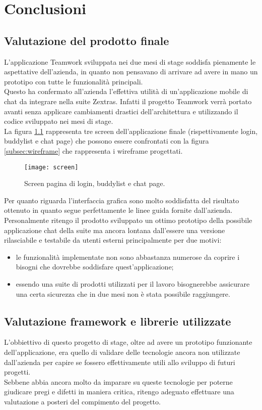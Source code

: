 
\chapter{Conclusioni}\label{chap:conclusions}
\section{Valutazione del prodotto finale}
L’applicazione Teamwork sviluppata nei due mesi di stage soddisfa pienamente le aspettative dell’azienda, in quanto non pensavano di arrivare ad avere in mano un prototipo con tutte le funzionalità principali. \\
Questo ha confermato all'azienda l'effettiva utilità di un'applicazione mobile di chat da integrare nella suite Zextras. Infatti il progetto Teamwork verrà portato avanti senza applicare cambiamenti drastici dell'architettura e utilizzando il codice sviluppato nei mesi di stage.\\
La figura \ref{sec:valutazione} rappresenta tre screen dell'applicazione finale (rispettivamente login, buddylist e chat page) che possono essere confrontati con la figura \ref{subsec:wireframe} che rappresenta i wireframe progettati.
\begin{figure}[H] 
	\centering
	\texttt{[image: screen]}
	\caption{Screen pagina di login, buddylist e chat page.}
	\label{sec:valutazione}
\end{figure}
Per quanto riguarda l'interfaccia grafica sono molto soddisfatta del risultato ottenuto in quanto segue perfettamente le linee guida fornite dall'azienda. \\
Personalmente ritengo il prodotto sviluppato un ottimo prototipo della possibile applicazione chat della suite ma ancora lontana dall'essere una versione rilasciabile e testabile da utenti esterni principalmente per due motivi:
\begin{itemize}
	\item le funzionalità implementate non sono abbastanza numerose da coprire i bisogni che dovrebbe soddisfare quest'applicazione;
	\item essendo una suite di prodotti utilizzati per il lavoro bisognerebbe assicurare una certa sicurezza che in due mesi non è stata possibile raggiungere.
\end{itemize}


\section{Valutazione framework e librerie utilizzate}
L'obbiettivo di questo progetto di stage, oltre ad avere un prototipo funzionante dell'applicazione, era quello di validare delle tecnologie ancora non utilizzate dall'azienda per capire se fossero effettivamente utili allo sviluppo di futuri progetti. \\
Sebbene abbia ancora molto da imparare su queste tecnologie per poterne giudicare pregi e difetti in maniera critica, ritengo adeguato effettuare una valutazione a posteri del compimento del progetto.
